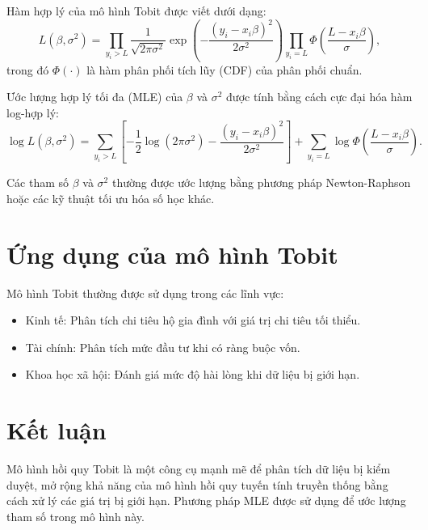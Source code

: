 Hàm hợp lý của mô hình Tobit được viết dưới dạng:
\begin{equation}
    L(\beta, \sigma^2) = \prod_{y_i > L} \frac{1}{\sqrt{2\pi\sigma^2}} \exp\left(-\frac{(y_i - x_i\beta)^2}{2\sigma^2}\right) \prod_{y_i = L} \Phi\left(\frac{L - x_i\beta}{\sigma}\right),
\end{equation}
trong đó $\Phi(\cdot)$ là hàm phân phối tích lũy (CDF) của phân phối chuẩn.

Ước lượng hợp lý tối đa (MLE) của $\beta$ và $\sigma^2$ được tính bằng cách cực đại hóa hàm log-hợp lý:
\begin{equation}
    \log L(\beta, \sigma^2) = \sum_{y_i > L} \left[-\frac{1}{2} \log(2\pi\sigma^2) - \frac{(y_i - x_i\beta)^2}{2\sigma^2}\right] + \sum_{y_i = L} \log \Phi\left(\frac{L - x_i\beta}{\sigma}\right).
\end{equation}

Các tham số $\beta$ và $\sigma^2$ thường được ước lượng bằng phương pháp Newton-Raphson hoặc các kỹ thuật tối ưu hóa số học khác.

\section{Ứng dụng của mô hình Tobit}
Mô hình Tobit thường được sử dụng trong các lĩnh vực:
\begin{itemize}
    \item Kinh tế: Phân tích chi tiêu hộ gia đình với giá trị chi tiêu tối thiểu.
    \item Tài chính: Phân tích mức đầu tư khi có ràng buộc vốn.
    \item Khoa học xã hội: Đánh giá mức độ hài lòng khi dữ liệu bị giới hạn.
\end{itemize}

\section{Kết luận}
Mô hình hồi quy Tobit là một công cụ mạnh mẽ để phân tích dữ liệu bị kiểm duyệt, mở rộng khả năng của mô hình hồi quy tuyến tính truyền thống bằng cách xử lý các giá trị bị giới hạn. Phương pháp MLE được sử dụng để ước lượng tham số trong mô hình này.
